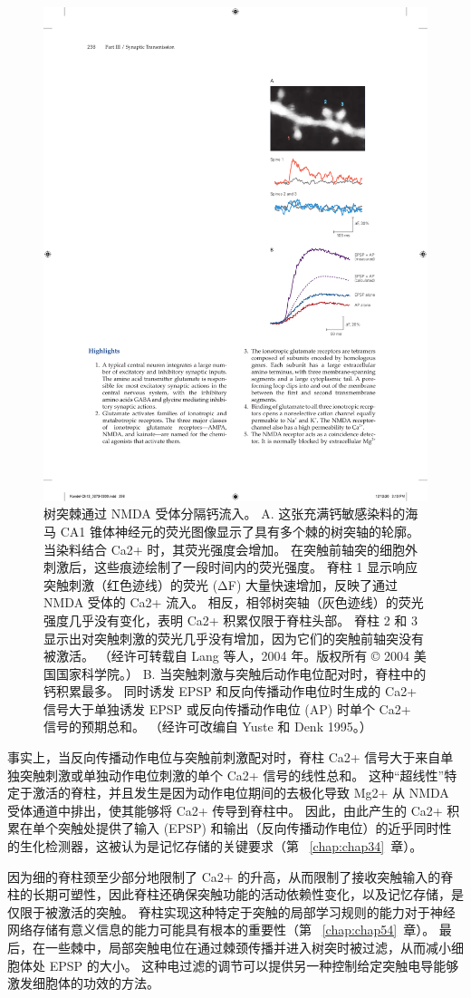 \begin{figure}[htbp]
	\centering
	\includegraphics[width=0.4\linewidth]{chap13/fig_13_18}
	\caption{树突棘通过 NMDA 受体分隔钙流入。 A. 这张充满钙敏感染料的海马 CA1 锥体神经元的荧光图像显示了具有多个棘的树突轴的轮廓。 当染料结合 Ca2+ 时，其荧光强度会增加。 在突触前轴突的细胞外刺激后，这些痕迹绘制了一段时间内的荧光强度。 脊柱 1 显示响应突触刺激（红色迹线）的荧光 (ΔF) 大量快速增加，反映了通过 NMDA 受体的 Ca2+ 流入。 相反，相邻树突轴（灰色迹线）的荧光强度几乎没有变化，表明 Ca2+ 积累仅限于脊柱头部。 脊柱 2 和 3 显示出对突触刺激的荧光几乎没有增加，因为它们的突触前轴突没有被激活。 （经许可转载自 Lang 等人，2004 年。版权所有 © 2004 美国国家科学院。） B. 当突触刺激与突触后动作电位配对时，脊柱中的钙积累最多。 同时诱发 EPSP 和反向传播动作电位时生成的 Ca2+ 信号大于单独诱发 EPSP 或反向传播动作电位 (AP) 时单个 Ca2+ 信号的预期总和。 （经许可改编自 Yuste 和 Denk 1995。）}
	\label{fig:13_18}
\end{figure}


事实上，当反向传播动作电位与突触前刺激配对时，脊柱 Ca2+ 信号大于来自单独突触刺激或单独动作电位刺激的单个 Ca2+ 信号的线性总和。
这种“超线性”特定于激活的脊柱，并且发生是因为动作电位期间的去极化导致 Mg2+ 从 NMDA 受体通道中排出，使其能够将 Ca2+ 传导到脊柱中。
因此，由此产生的 Ca2+ 积累在单个突触处提供了输入 (EPSP) 和输出（反向传播动作电位）的近乎同时性的生化检测器，这被认为是记忆存储的关键要求（第 ~\ref{chap:chap34}~章）。


因为细的脊柱颈至少部分地限制了 Ca2+ 的升高，从而限制了接收突触输入的脊柱的长期可塑性，因此脊柱还确保突触功能的活动依赖性变化，以及记忆存储，是仅限于被激活的突触。
脊柱实现这种特定于突触的局部学习规则的能力对于神经网络存储有意义信息的能力可能具有根本的重要性（第 ~\ref{chap:chap54}~章）。
最后，在一些棘中，局部突触电位在通过棘颈传播并进入树突时被过滤，从而减小细胞体处 EPSP 的大小。
这种电过滤的调节可以提供另一种控制给定突触电导能够激发细胞体的功效的方法。



